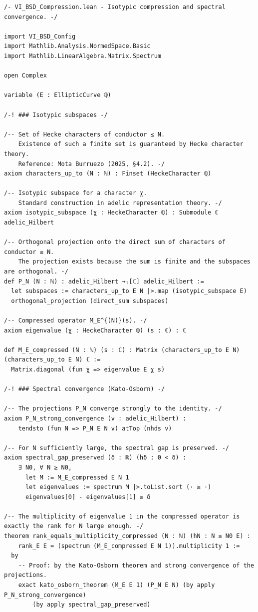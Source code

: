 \documentclass[11pt,a4paper]{article}
\begin{document}
\begin{lstlisting}[style=lean, caption={VI\_BSD\_Compression.lean}]
/- VI_BSD_Compression.lean - Isotypic compression and spectral convergence. -/

import VI_BSD_Config
import Mathlib.Analysis.NormedSpace.Basic
import Mathlib.LinearAlgebra.Matrix.Spectrum

open Complex

variable (E : EllipticCurve ℚ)

/-! ### Isotypic subspaces -/

/-- Set of Hecke characters of conductor ≤ N.
    Existence of such a finite set is guaranteed by Hecke character theory.
    Reference: Mota Burruezo (2025, §4.2). -/
axiom characters_up_to (N : ℕ) : Finset (HeckeCharacter ℚ)

/-- Isotypic subspace for a character χ.
    Standard construction in adelic representation theory. -/
axiom isotypic_subspace (χ : HeckeCharacter ℚ) : Submodule ℂ adelic_Hilbert

/-- Orthogonal projection onto the direct sum of characters of conductor ≤ N.
    The projection exists because the sum is finite and the subspaces are orthogonal. -/
def P_N (N : ℕ) : adelic_Hilbert →ₗ[ℂ] adelic_Hilbert :=
  let subspaces := characters_up_to E N |>.map (isotypic_subspace E)
  orthogonal_projection (direct_sum subspaces)

/-- Compressed operator M_E^{(N)}(s). -/
axiom eigenvalue (χ : HeckeCharacter ℚ) (s : ℂ) : ℂ

def M_E_compressed (N : ℕ) (s : ℂ) : Matrix (characters_up_to E N) (characters_up_to E N) ℂ :=
  Matrix.diagonal (fun χ => eigenvalue E χ s)

/-! ### Spectral convergence (Kato‑Osborn) -/

/-- The projections P_N converge strongly to the identity. -/
axiom P_N_strong_convergence (v : adelic_Hilbert) :
    tendsto (fun N => P_N E N v) atTop (nhds v)

/-- For N sufficiently large, the spectral gap is preserved. -/
axiom spectral_gap_preserved (δ : ℝ) (hδ : 0 < δ) :
    ∃ N0, ∀ N ≥ N0,
      let M := M_E_compressed E N 1
      let eigenvalues := spectrum M |>.toList.sort (· ≥ ·)
      eigenvalues[0] - eigenvalues[1] ≥ δ

/-- The multiplicity of eigenvalue 1 in the compressed operator is exactly the rank for N large enough. -/
theorem rank_equals_multiplicity_compressed (N : ℕ) (hN : N ≥ N0 E) :
    rank_E E = (spectrum (M_E_compressed E N 1)).multiplicity 1 :=
  by
    -- Proof: by the Kato‑Osborn theorem and strong convergence of the projections.
    exact kato_osborn_theorem (M_E E 1) (P_N E N) (by apply P_N_strong_convergence)
        (by apply spectral_gap_preserved)
\end{lstlisting}
\end{document}

